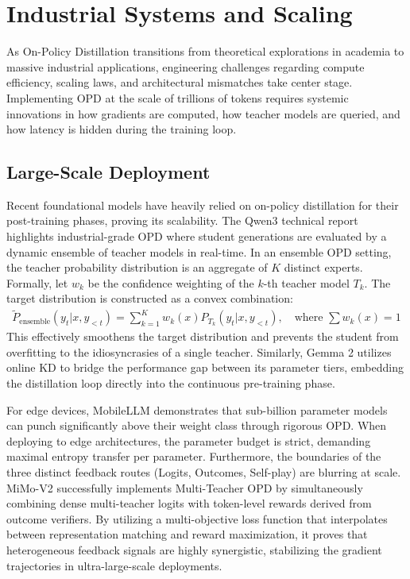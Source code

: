\documentclass{article} %
\begin{document}
\section{Industrial Systems and Scaling}
\label{sec:systems}

As On-Policy Distillation transitions from theoretical explorations in academia to massive industrial applications, engineering challenges regarding compute efficiency, scaling laws, and architectural mismatches take center stage. Implementing OPD at the scale of trillions of tokens requires systemic innovations in how gradients are computed, how teacher models are queried, and how latency is hidden during the training loop.

\subsection{Large-Scale Deployment}
Recent foundational models have heavily relied on on-policy distillation for their post-training phases, proving its scalability. The Qwen3 technical report \citep{2505.09388} highlights industrial-grade OPD where student generations are evaluated by a dynamic ensemble of teacher models in real-time. In an ensemble OPD setting, the teacher probability distribution is an aggregate of $K$ distinct experts. Formally, let $w_k$ be the confidence weighting of the $k$-th teacher model $T_k$. The target distribution is constructed as a convex combination:
\begin{align}
\tilde{P}_{\text{ensemble}}(y_t | x, y_{<t}) = \sum_{k=1}^K w_k(x) P_{T_k}(y_t | x, y_{<t}), \quad \text{where } \sum w_k(x) = 1
\end{align}
This effectively smoothens the target distribution and prevents the student from overfitting to the idiosyncrasies of a single teacher. Similarly, Gemma 2 \citep{2406.06608} utilizes online KD to bridge the performance gap between its parameter tiers, embedding the distillation loop directly into the continuous pre-training phase. 

For edge devices, MobileLLM \citep{2509.24945} demonstrates that sub-billion parameter models can punch significantly above their weight class through rigorous OPD. When deploying to edge architectures, the parameter budget is strict, demanding maximal entropy transfer per parameter. Furthermore, the boundaries of the three distinct feedback routes (Logits, Outcomes, Self-play) are blurring at scale. MiMo-V2 \citep{2601.02780} successfully implements Multi-Teacher OPD by simultaneously combining dense multi-teacher logits with token-level rewards derived from outcome verifiers. By utilizing a multi-objective loss function that interpolates between representation matching and reward maximization, it proves that heterogeneous feedback signals are highly synergistic, stabilizing the gradient trajectories in ultra-large-scale deployments.
\end{document}
